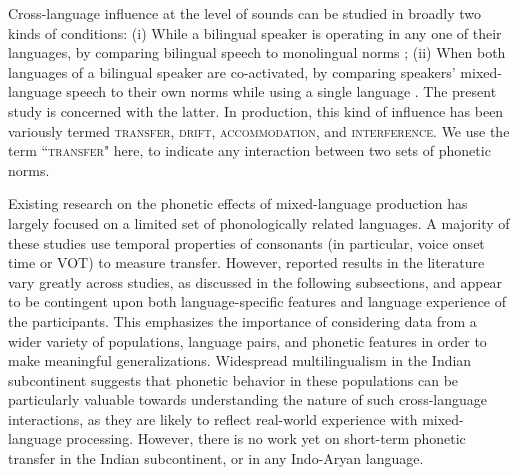 \documentclass[12 pt]{article}
\begin{document}
Cross-language influence at the level of sounds can be studied in broadly two kinds of conditions:
(i) While a bilingual speaker is operating in any one of their languages, by comparing bilingual speech to monolingual norms \citep[e.g.][]{guion2003vowel,caramazza1973acquisition,flege1987production}; %
(ii) When both languages of a bilingual speaker are co-activated, by comparing speakers' mixed-language speech to their own norms while using a single language \citep[e.g.][]{grosjean1994going, bullock2009trying,elias2017effects, simonet2014phonetic}. %
The present study is concerned with the latter. In production, this kind of influence has been variously termed \textsc{transfer, drift, accommodation,} and \textsc{interference}. We use the term \textsc{``transfer"} here, to indicate any interaction between two sets of phonetic norms.

Existing research on the phonetic effects of mixed-language production has largely focused on a limited set of phonologically related languages. A majority of these studies use temporal properties of consonants (in particular, voice onset time or VOT) to measure transfer. However, reported results in the literature vary greatly across studies, as discussed in the following subsections, and appear to be contingent upon both language-specific features and language experience of the participants. This emphasizes the importance of considering data from a wider variety of
populations, language pairs,  and phonetic features in order to make meaningful generalizations. Widespread multilingualism in the Indian subcontinent suggests that phonetic  behavior in these populations can be particularly valuable towards understanding the nature of such cross-language interactions, as they are likely to reflect real-world experience with mixed-language processing. However, there is no work yet on short-term phonetic transfer in the Indian subcontinent, or in any Indo-Aryan language. 
\end{document}
